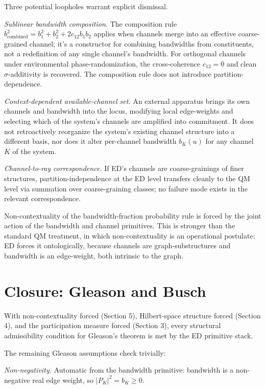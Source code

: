 \documentclass[11pt,a4paper]{article}
\begin{document}
Three potential loopholes warrant explicit dismissal.

\emph{Sublinear bandwidth composition.} The composition rule $b^2_{\mathrm{combined}} = b^2_1 + b^2_2 + 2c_{12} b_1 b_2$ applies when channels merge into an effective coarse-grained channel; it's a constructor for combining bandwidths from constituents, not a redefinition of any single channel's bandwidth. For orthogonal channels under environmental phase-randomization, the cross-coherence $c_{12} = 0$ and clean $\sigma$-additivity is recovered. The composition rule does not introduce partition-dependence.

\emph{Context-dependent available-channel set.} An external apparatus brings its own channels and bandwidth into the locus, modifying local edge-weights and selecting which of the system's channels are amplified into commitment. It does not retroactively reorganize the system's existing channel structure into a different basis, nor does it alter per-channel bandwidth $b_K(u)$ for any channel $K$ of the system.

\emph{Channel-to-ray correspondence.} If ED's channels are coarse-grainings of finer structures, partition-independence at the ED level transfers cleanly to the QM level via summation over coarse-graining classes; no failure mode exists in the relevant correspondence.

Non-contextuality of the bandwidth-fraction probability rule is forced by the joint action of the bandwidth and channel primitives. This is stronger than the standard QM treatment, in which non-contextuality is an operational postulate: ED forces it ontologically, because channels are graph-substructures and bandwidth is an edge-weight, both intrinsic to the graph.

\section{Closure: Gleason and Busch}

With non-contextuality forced (Section 5), Hilbert-space structure forced (Section 4), and the participation measure forced (Section 3), every structural admissibility condition for Gleason's theorem is met by the ED primitive stack.

The remaining Gleason assumptions check trivially:

\emph{Non-negativity.} Automatic from the bandwidth primitive: bandwidth is a non-negative real edge weight, so $|P_K|^2 = b_K \geq 0$.
\end{document}
